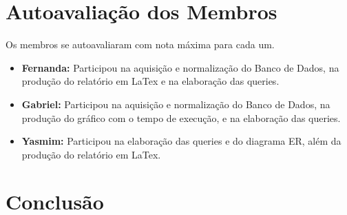 \documentclass{article}
\begin{document}
\section{Autoavaliação dos Membros}
Os membros se autoavaliaram com nota máxima para cada um.
\begin{itemize}
\item \textbf{Fernanda:} Participou na aquisição e normalização do Banco de Dados, na produção do relatório em LaTex e na elaboração das queries.
\item \textbf{Gabriel:} Participou na aquisição e normalização do Banco de Dados, na produção do gráfico com o tempo de execução, e na elaboração das queries.
\item \textbf{Yasmim:} Participou na elaboração das queries e do diagrama ER, além da produção do relatório em LaTex.
\end{itemize}
\section{Conclusão}



\end{document}
